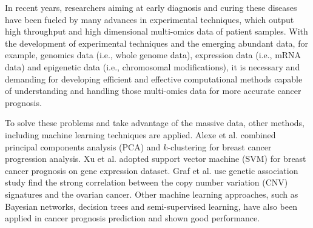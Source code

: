 \documentclass{article}
\begin{document}
In recent years, researchers aiming at early diagnosis and curing these diseases have been fueled by many advances in experimental techniques, which output high throughput and high dimensional multi-omics data of patient samples\cite{wooster2003breast,goossens2015cancer}. With the development of experimental techniques and the emerging abundant data, for example, genomics data (i.e., whole genome data), expression data (i.e., mRNA data) and epigenetic data (i.e., chromosomal modifications), it is necessary and demanding for developing efficient and effective computational methods capable of understanding and handling those multi-omics data for more accurate cancer prognosis\cite{zhu2020application}. 


To solve these problems and take advantage of the massive data, other methods, including machine learning techniques are applied. Alexe et al.\cite{alexe2007analysis} combined principal components analysis (PCA) and $k$-clustering for breast cancer progression analysis. Xu et al.\cite{xu2012gene} adopted support vector machine (SVM) for breast cancer prognosis on gene expression dataset. Graf et al.\cite{graf2021association} use genetic association study find the strong correlation between the copy number variation (CNV) signatures and the ovarian cancer. Other machine learning approaches, such as Bayesian networks, decision trees and semi-supervised learning, have also been applied in cancer prognosis prediction and shown good performance\cite{kourou2015machine}.
\end{document}
